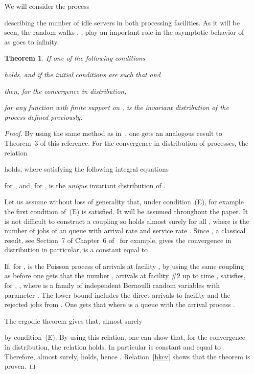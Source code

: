 \documentclass{amsart}
\newtheorem{theorem}{Theorem}
\begin{document}
We will consider the process 

describing the number of idle servers in both processing facilities. As it will be seen, the random walks , ,  play an important role in the asymptotic behavior of  as  goes to infinity.

\begin{theorem}\label{T1}
If one of the following conditions

holds, and if the initial conditions are such that  and

then, for the convergence in distribution,

for any function  with finite support on ,  is the invariant distribution of the process  defined previously.
\end{theorem}

\begin{proof}
By using the same method as in~\cite{Hunt}, one gets an analogous result to Theorem~3 of this reference. For the convergence in distribution of processes, the relation

holds, where  satisfying the following integral equations

for ,  and, for ,  is the {\em unique } invariant distribution of .

Let us assume without loss of generality  that, under condition~(E), for example the first condition of~(E) is satisfied. It will be assumed throughout the paper. It is not difficult to construct a coupling so  holds almost surely for all , where  is the number of jobs of an  queue with arrival rate  and service rate . Since , a classical result, see Section~7 of Chapter~6 of~\cite{Robert} for example, gives the convergence in distribution  in particular,  is a constant equal to . 

If, for ,  is the Poisson process of arrivals at facility , by using the same coupling as before one gets that the number , arrivals at facility \#2 up to time , satisfies, for , , 
 where  is a family of independent Bernoulli random variables with parameter . The lower bound includes the direct arrivals  to facility  and the rejected jobs from . One gets that  where  is a  queue with the arrival process .

The ergodic theorem gives that, almost surely

by condition~(E). By using this relation, one can show that, for the convergence in distribution, the relation  holds. In particular  is constant and equal to . Therefore, almost surely,  holds, hence . Relation~\eqref{hkcv} shows that the theorem is proven.
\end{proof} 
\end{document}
